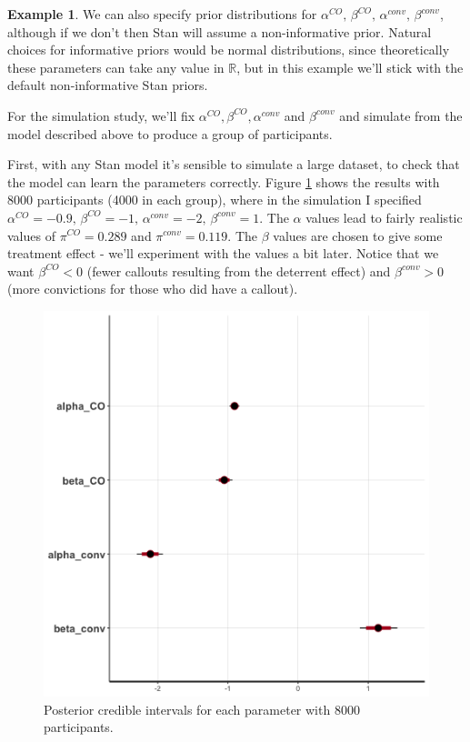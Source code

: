 \documentclass[
  openany]{book}
\theoremstyle{definition}
\theoremstyle{definition}
\newtheorem{example}{Example}[chapter]
\theoremstyle{definition}
\theoremstyle{definition}
\theoremstyle{remark}
\begin{document}
\begin{example}
We can also specify prior distributions for \(\alpha^{CO},\,\beta^{CO},\,\alpha^{conv},\,\beta^{conv}\), although if we don't then Stan will assume a non-informative prior. Natural choices for informative priors would be normal distributions, since theoretically these parameters can take any value in \(\mathbb{R}\), but in this example we'll stick with the default non-informative Stan priors.

For the simulation study, we'll fix \(\alpha^{CO},\beta^{CO}, \alpha^{conv}\) and \(\beta^{conv}\) and simulate from the model described above to produce a group of participants.

First, with any Stan model it's sensible to simulate a large dataset, to check that the model can learn the parameters correctly. Figure \ref{fig:check8000} shows the results with 8000 participants (4000 in each group), where in the simulation I specified \(\alpha^{CO}=-0.9,\,\beta^{CO}=-1,\,\alpha^{conv}=-2,\,\beta^{conv}=1\). The \(\alpha\) values lead to fairly realistic values of \(\pi^{CO} = 0.289\) and \(\pi^{conv} = 0.119\). The \(\beta\) values are chosen to give some treatment effect - we'll experiment with the values a bit later. Notice that we want \(\beta^{CO}<0\) (fewer callouts resulting from the deterrent effect) and \(\beta^{conv}>0\) (more convictions for those who did have a callout).

\begin{figure}
\includegraphics[width=6.67in]{images/stan_np8000} \caption{Posterior credible intervals for each parameter with 8000 participants.}\label{fig:check8000}
\end{figure}


\end{example}
\end{document}
